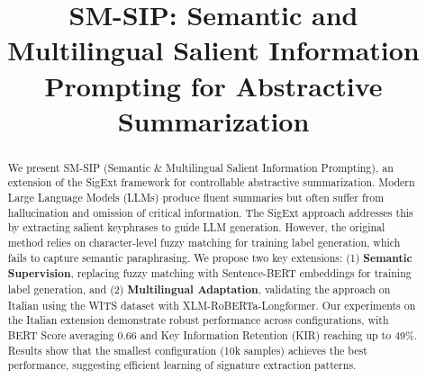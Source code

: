 \documentclass[conference]{IEEEtran}
\begin{document}
\title{SM-SIP: Semantic and Multilingual Salient Information Prompting for Abstractive Summarization}

\author{
\and
{}
\and
{}
\and
{}
\and
{}
}

\maketitle

\begin{abstract}
We present SM-SIP (Semantic \& Multilingual Salient Information Prompting), an extension of the SigExt framework for controllable abstractive summarization. Modern Large Language Models (LLMs) produce fluent summaries but often suffer from hallucination and omission of critical information. The SigExt approach addresses this by extracting salient keyphrases to guide LLM generation. However, the original method relies on character-level fuzzy matching for training label generation, which fails to capture semantic paraphrasing. We propose two key extensions: (1) \textbf{Semantic Supervision}, replacing fuzzy matching with Sentence-BERT embeddings for training label generation, and (2) \textbf{Multilingual Adaptation}, validating the approach on Italian using the WITS dataset with XLM-RoBERTa-Longformer. Our experiments on the Italian extension demonstrate robust performance across configurations, with BERT Score averaging 0.66 and Key Information Retention (KIR) reaching up to 49\%. Results show that the smallest configuration (10k samples) achieves the best performance, suggesting efficient learning of signature extraction patterns.
\end{abstract}
\end{document}
